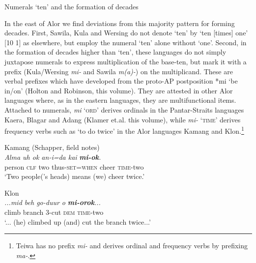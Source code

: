 {\begin{table}
\caption{Numerals `ten' and the formation of decades}
\end{table}

In the east of Alor we find deviations from this majority pattern for forming decades. First, Sawila, Kula and Wersing do not denote `ten' by `ten [times] one' [10 1] as elsewhere, but employ the numeral `ten' alone without `one'. Second, in the formation of decades higher than `ten', these languages do not simply juxtapose numerals to express multiplication of the base-ten, but mark it with a prefix (Kula/Wersing \textit{mi-} and Sawila \textit{m(a)-}) on the multiplicand. These are verbal prefixes which have developed from the proto-AP postposition *mi `be in/on' (Holton and Robinson, this volume). They are attested in other Alor languages where, as in the eastern languages, they are multifunctional items. Attached to numerals, \textit{mi} \textsc{`ord'} derives ordinals in the Pantar-Straits languages Kaera, Blagar and Adang (Klamer et.al. this volume), while \textit{mi-} \textsc{`time'} derives frequency verbs such as `to do twice' in the Alor languages Kamang and Klon.\footnote{{}   Teiwa has no prefix \textit{mi-} and derives ordinal and frequency verbs by prefixing \textit{ma-}.}



\ea%
\label{ex:13}
Kamang (Schapper, field notes)\\
\gll \textit{Alma    uh    ok    an-i{\ng}=da{\ng}    kai}    \textbf{\textit{mi-ok}}\textit{.}\\
     person  \textsc{clf}  two  thus-\textsc{set=when}  cheer  \textsc{time}{}-two  \\
\glt `Two people('s heads) means (we) cheer twice.'
\z









\ea%
\label{ex:14}
Klon \citep{Baird2008}\\
\gll   \textit{...mid  beh     go-duur  o}  \textbf{\textit{mi-orok}}\textit{...}\\
       climb  branch    3-cut    \textsc{dem}  \textsc{time}{}-two \\
\glt `... (he) climbed up (and) cut the branch twice...'
\z







}
